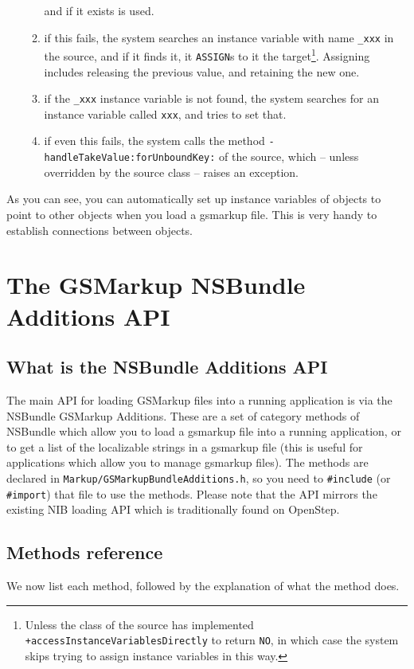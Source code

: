 \begin{enumerate}
\begin{enumerate}
and if it exists is used.
\item if this fails, the system searches an instance variable with name
\texttt{\_xxx} in the source, and if it finds it, it \texttt{ASSIGN}s to it
the target\footnote{Unless the class of the source has implemented
\texttt{+accessInstanceVariablesDirectly} to return \texttt{NO}, in
which case the system skips trying to assign instance variables in
this way.}.  Assigning includes releasing the previous value, and
retaining the new one.
\item if the \texttt{\_xxx} instance variable is not found, the system
searches for an instance variable called \texttt{xxx}, and tries to set
that.
\item if even this fails, the system calls the method
\texttt{-handleTakeValue:forUnboundKey:} of the source, which -- unless
overridden by the source class -- raises an exception.
\end{enumerate}
\end{enumerate}
As you can see, you can automatically set up instance variables of
objects to point to other objects when you load a gsmarkup file.  This is
very handy to establish connections between objects.

\section{The GSMarkup NSBundle Additions API}

\subsection{What is the NSBundle Additions API}
The main API for loading GSMarkup files into a running application is via
the NSBundle GSMarkup Additions.  These are a set of category methods of
NSBundle which allow you to load a gsmarkup file into a running
application, or to get a list of the localizable strings in a gsmarkup
file (this is useful for applications which allow you to manage gsmarkup
files).  The methods are declared in
\texttt{Markup/GSMarkupBundleAdditions.h}, so you need to \texttt{\#include} 
(or \texttt{\#import}) that file to use the methods.  Please note that
the API mirrors the existing NIB loading API which is traditionally
found on OpenStep.

\subsection{Methods reference}
We now list each method, followed by the explanation of what the
method does.

